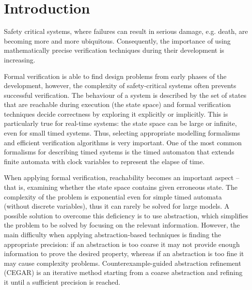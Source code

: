 \chapter{Introduction}
\label{chap:introduction}

Safety critical systems, where failures can result in serious damage, e.g. death, are becoming more and more ubiquitous. Consequently, the importance of using mathematically precise verification techniques during their development is increasing.  

Formal verification is able to find design problems from early phases of the development, however, the complexity of safety-critical systems often prevents successful verification. The behaviour of a system is described by the set of states that are reachable during execution (the state space) and formal verification techniques decide correctness by exploring it explicitly or implicitly. This is particularly true for real-time systems: the state space can be large or infinite, even for small timed systems. Thus, selecting appropriate modelling formalisms and efficient verification algorithms is very important. One of the most common formalisms for describing timed systems is the timed automaton that extends finite automata with clock variables to represent the elapse of time.

When applying formal verification, reachability becomes an important aspect – that is, examining whether the state space contains given erroneous state. The complexity of the problem is exponential even for simple timed automata (without discrete variables), thus it can rarely be solved for large models. A possible solution to overcome this deficiency is to use abstraction, which simplifies the problem to be solved by focusing on the relevant information. However, the main difficulty when applying abstraction-based techniques is finding the appropriate precision: if an abstraction is too coarse it may not provide enough information to prove the desired property, whereas if an abstraction is too fine it may cause complexity problems. Counterexample-guided abstraction refinement (CEGAR) is an iterative method starting from a coarse abstraction and refining it until a sufficient precision is reached.


